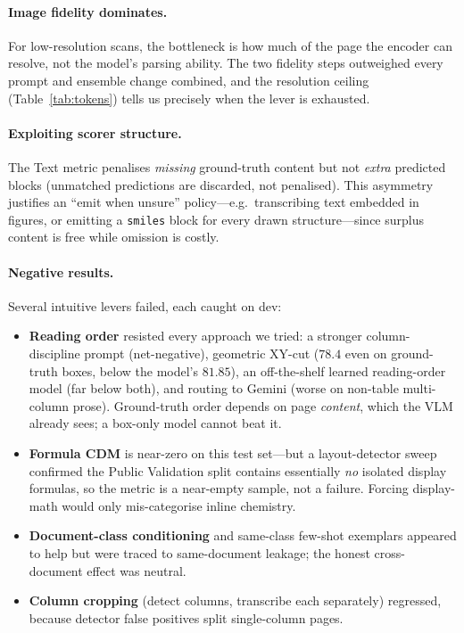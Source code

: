 \documentclass[11pt]{article}
\begin{document}
\paragraph{Image fidelity dominates.} For low-resolution scans, the bottleneck is
how much of the page the encoder can resolve, not the model's parsing ability. The
two fidelity steps outweighed every prompt and ensemble change combined, and the
resolution ceiling (Table~\ref{tab:tokens}) tells us precisely when the lever is
exhausted.

\paragraph{Exploiting scorer structure.} The Text metric penalises \emph{missing}
ground-truth content but not \emph{extra} predicted blocks (unmatched predictions
are discarded, not penalised). This asymmetry justifies an ``emit when unsure''
policy---e.g.\ transcribing text embedded in figures, or emitting a \texttt{smiles}
block for every drawn structure---since surplus content is free while omission is
costly.

\paragraph{Negative results.} Several intuitive levers failed, each caught on dev:
\begin{itemize}[nosep]
  \item \textbf{Reading order} resisted every approach we tried: a stronger
    column-discipline prompt (net-negative), geometric XY-cut ($78.4$ even on
    ground-truth boxes, below the model's $81.85$), an off-the-shelf learned
    reading-order model \citep[LayoutReader;][]{wang2021layoutreader} (far below both), and routing to Gemini
    (worse on non-table multi-column prose). Ground-truth order depends on page
    \emph{content}, which the VLM already sees; a box-only model cannot beat it.
  \item \textbf{Formula CDM} is near-zero on this test set---but a layout-detector
    sweep confirmed the Public Validation split contains essentially \emph{no}
    isolated display formulas, so the metric is a near-empty sample, not a failure.
    Forcing display-math would only mis-categorise inline chemistry.
  \item \textbf{Document-class conditioning} and same-class few-shot exemplars
    appeared to help but were traced to same-document leakage; the honest
    cross-document effect was neutral.
  \item \textbf{Column cropping} (detect columns, transcribe each separately)
    regressed, because detector false positives split single-column pages.
\end{itemize}
\end{document}
